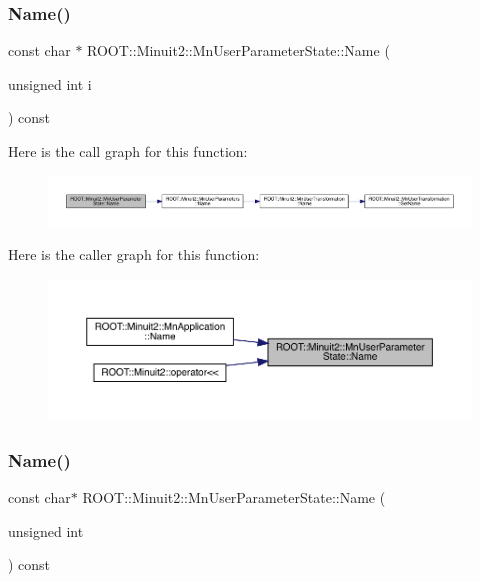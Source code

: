 \subsubsection{\texorpdfstring{Name()}{Name()}\hspace{0.1cm}{\footnotesize\ttfamily [1/3]}}
{\footnotesize\ttfamily const char $\ast$ R\+O\+O\+T\+::\+Minuit2\+::\+Mn\+User\+Parameter\+State\+::\+Name (\begin{DoxyParamCaption}\item[{unsigned int}]{i }\end{DoxyParamCaption}) const}

Here is the call graph for this function\+:
\nopagebreak
\begin{figure}[H]
\begin{center}
\leavevmode
\includegraphics[width=350pt]{d3/de0/classROOT_1_1Minuit2_1_1MnUserParameterState_a9bb4ce8eb968c5112c3e33a0b7a32609_cgraph}
\end{center}
\end{figure}
Here is the caller graph for this function\+:
\nopagebreak
\begin{figure}[H]
\begin{center}
\leavevmode
\includegraphics[width=350pt]{d3/de0/classROOT_1_1Minuit2_1_1MnUserParameterState_a9bb4ce8eb968c5112c3e33a0b7a32609_icgraph}
\end{center}
\end{figure}
\mbox{\label{classROOT_1_1Minuit2_1_1MnUserParameterState_afe93ae6453653734e45f0d66d64a609c}} 
\subsubsection{\texorpdfstring{Name()}{Name()}\hspace{0.1cm}{\footnotesize\ttfamily [2/3]}}
{\footnotesize\ttfamily const char$\ast$ R\+O\+O\+T\+::\+Minuit2\+::\+Mn\+User\+Parameter\+State\+::\+Name (\begin{DoxyParamCaption}\item[{unsigned int}]{ }\end{DoxyParamCaption}) const}

